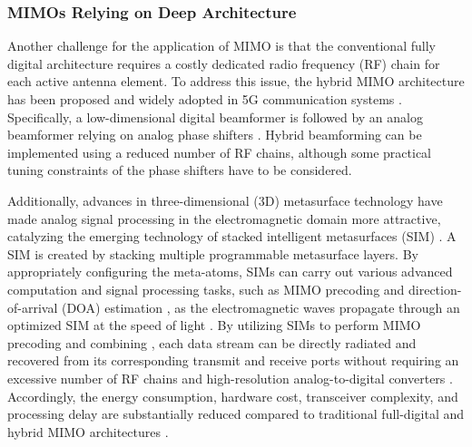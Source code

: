 \documentclass[lettersize,journal]{IEEEtran}
\begin{document}
\subsubsection{MIMOs Relying on Deep Architecture}
Another challenge for the application of MIMO is that the conventional fully digital architecture requires a costly dedicated radio frequency (RF) chain for each active antenna element. To address this issue, the hybrid MIMO architecture has been proposed and widely adopted in 5G communication systems \cite{TWC_2014_Ayach_Spatially}. Specifically, a low-dimensional digital beamformer is followed by an analog beamformer relying on analog phase shifters \cite{JSTSP_2016_Sohrabi_Hybrid}. Hybrid beamforming can be implemented using a reduced number of RF chains, although some practical tuning constraints of the phase shifters have to be considered.

Additionally, advances in three-dimensional (3D) metasurface technology have made analog signal processing in the electromagnetic domain more attractive, catalyzing the emerging technology of stacked intelligent metasurfaces (SIM) \cite{WCL_2025_Huang_Stacked, WCL_2024_Niu_Stacked, TCCN_2025_Hao_Multi, ICC_2024_An_Stacked, WCL_2024_Lin_Stacked}. A SIM is created by stacking multiple programmable metasurface layers. By appropriately configuring the meta-atoms, SIMs can carry out various advanced computation and signal processing tasks, such as MIMO precoding \cite{JSAC_2023_An_Stacked} and direction-of-arrival (DOA) estimation \cite{arXiv_2023_An_Stacked_DOA}, as the electromagnetic waves propagate through an optimized SIM at the speed of light \cite{NE_2022_Liu_A}. By utilizing SIMs to perform MIMO precoding and combining \cite{arXiv_2023_An_Stacked_DOA, JSAC_2023_An_Stacked}, each data stream can be directly radiated and recovered from its corresponding transmit and receive ports without requiring an excessive number of RF chains and high-resolution analog-to-digital converters \cite{arXiv_2023_An_Stacked_mag}. Accordingly, the energy consumption, hardware cost, transceiver complexity, and processing delay are substantially reduced compared to traditional full-digital and hybrid MIMO architectures \cite{arXiv_2023_An_Stacked, arXiv_2024_Liu_Stackedmag}.
\end{document}
